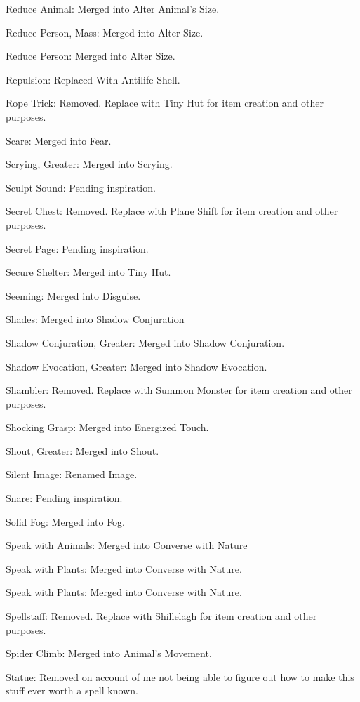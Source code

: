 {\begin{list}{}{\leftmargin=1em}
 \item Reduce Animal: Merged into Alter Animal's Size.
 \item Reduce Person, Mass: Merged into Alter Size.
 \item Reduce Person: Merged into Alter Size.
 \item Repulsion: Replaced With Antilife Shell.
 \item Rope Trick: Removed. Replace with Tiny Hut for item creation and other purposes.
 \item Scare: Merged into Fear.
 \item Scrying, Greater: Merged into Scrying.
 \item Sculpt Sound: Pending inspiration.
 \item Secret Chest: Removed. Replace with Plane Shift for item creation and other purposes.
 \item Secret Page: Pending inspiration.
 \item Secure Shelter: Merged into Tiny Hut.
 \item Seeming: Merged into Disguise.
 \item Shades: Merged into Shadow Conjuration
 \item Shadow Conjuration, Greater: Merged into Shadow Conjuration.
 \item Shadow Evocation, Greater: Merged into Shadow Evocation.
 \item Shambler: Removed. Replace with Summon Monster for item creation and other purposes.
 \item Shocking Grasp: Merged into Energized Touch.
 \item Shout, Greater: Merged into Shout.
 \item Silent Image: Renamed Image.
 \item Snare: Pending inspiration.
 \item Solid Fog: Merged into Fog.
 \item Speak with Animals: Merged into Converse with Nature
 \item Speak with Plants: Merged into Converse with Nature.
 \item Speak with Plants: Merged into Converse with Nature.
 \item Spellstaff: Removed. Replace with Shillelagh for item creation and other purposes.
 \item Spider Climb: Merged into Animal's Movement.
 \item Statue: Removed on account of me not being able to figure out how to make this stuff ever worth a spell known.

\end{list}}

